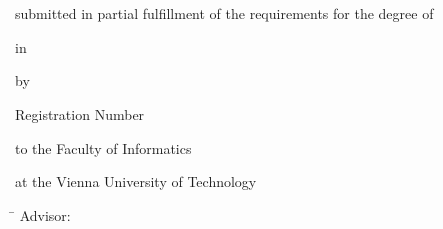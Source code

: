 \begin{center}
{\ \vspace{3.4cm}}

\begin{minipage}[t][2.8cm][s]{\textwidth}%
\centering
\thesistitlefontHUGE\sffamily\bfseries\tuinfthesistitle\\
\bigskip
{\thesistitlefonthuge\sffamily\bfseries\tuinfthesissubtitle}
\end{minipage}

\vspace{1.3cm}

{\thesistitlefontLARGE\sffamily \tuinfthesistypeen}

\vspace{6mm}

{\thesistitlefontlarge\sffamily submitted in partial fulfillment of the requirements for the degree of}

\vspace{6mm}

{\thesistitlefontLARGE\sffamily\bfseries \tuinfthesisdegreeen}

\vspace{6mm}

{\thesistitlefontlarge\sffamily in}

\vspace{6mm}

{\thesistitlefontLarge\sffamily\bfseries \tuinfthesiscurriculumen}

\vspace{6.5mm}

{\thesistitlefontlarge\sffamily by}

\vspace{6mm}

{\thesistitlefontLarge\sffamily\bfseries \tuinfthesisauthor}

\vspace{1.5mm}

{\thesistitlefontlarge\sffamily Registration Number \tuinfthesismatrikelno} 

\vspace{1.4cm}

\begin{minipage}[t][1.6cm][t]{\textwidth}%
  \vspace{0pt}\raggedright\thesistitlefontnormalsize\sffamily
  to the Faculty of Informatics 

  at the Vienna University of Technology
\end{minipage}

\vspace{0pt}\raggedright\thesistitlefontnormalsize\sffamily
\begin{minipage}[t][2.5cm][t]{\textwidth}%
  \begin{tabbing}%
	    \hspace{19mm} \= \hspace{66mm} \kill
	    Advisor: \> \tuinfthesisbetreins\\
     \end{tabbing}
\end{minipage}


\end{center}
